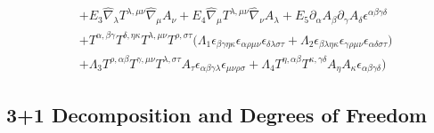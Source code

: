 \documentclass[twocolumn,
  showpacs,showkeys,prd,superscriptaddress]{revtex4-1}
\begin{document}
\begin{equation}
\begin{split}
    \\
    & + E_3\hat{\nabla}_\lambda T^{\lambda,\mu\nu}\hat{\nabla}_\mu A_\nu+E_4\hat{\nabla}_\mu T^{\lambda,\mu\nu}\hat{\nabla}_\nu A_\lambda + E_5\partial_\alpha A_\beta\partial_\gamma A_\delta \epsilon^{\alpha\beta\gamma\delta}
    \\
    & + T^{\alpha,\beta\gamma}T^{\delta,\eta\kappa}T^{\lambda,\mu\nu}T^{\rho,\sigma\tau}\Big(\Lambda_1\epsilon_{\beta\gamma\eta\kappa}\epsilon_{\alpha\rho\mu\nu}\epsilon_{\delta\lambda\sigma\tau}+\Lambda_2\epsilon_{\beta\lambda\eta\kappa}\epsilon_{\gamma\rho\mu\nu}\epsilon_{\alpha\delta\sigma\tau}\Big)
    \\
    & + \Lambda_3 T^{\rho,\alpha\beta}T^{\gamma,\mu\nu}T^{\lambda,\sigma\tau}A_\tau \epsilon_{\alpha\beta\gamma\lambda}\epsilon_{\mu\nu\rho\sigma}+\Lambda_4T^{\eta,\alpha\beta}T^{\kappa,\gamma\delta}A_\eta A_\kappa\epsilon_{\alpha\beta\gamma\delta}\Bigg)
  \end{split}
\end{equation}


\subsection*{3+1 Decomposition  and Degrees of Freedom}
\end{document}
